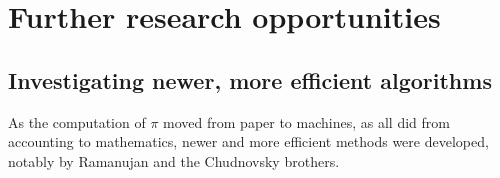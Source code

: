 \section{Further research opportunities}

\subsection{Investigating newer, more efficient algorithms}

As the computation of $\pi$ moved from paper to machines, as all did from accounting to 
mathematics, newer and more efficient methods were developed, notably by Ramanujan and 
the Chudnovsky brothers. 